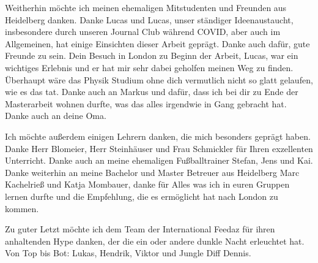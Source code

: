 Weitherhin möchte ich meinen ehemaligen Mitstudenten und Freunden aus Heidelberg danken. Danke Lucas und Lucas, unser ständiger Ideenaustaucht, insbesondere durch unseren Journal Club während COVID, aber auch im Allgemeinen, hat einige Einsichten dieser Arbeit geprägt. Danke auch dafür, gute Freunde zu sein. Dein Besuch in London zu Beginn der Arbeit, Lucas, war ein wichtiges Erlebnis und er hat mir sehr dabei geholfen meinen Weg zu finden. Überhaupt wäre das Physik Studium ohne dich vermutlich nicht so glatt gelaufen, wie es das tat. Danke auch an Markus und dafür, dass ich bei dir zu Ende der Masterarbeit wohnen durfte, was das alles irgendwie in Gang gebracht hat. Danke auch an deine Oma.

Ich möchte außerdem einigen Lehrern danken, die mich besonders geprägt haben. Danke Herr Blomeier, Herr Steinhäuser  und Frau Schmickler für Ihren exzellenten Unterricht. Danke auch an meine ehemaligen Fußballtrainer Stefan, Jens und Kai. Danke weiterhin an meine Bachelor und Master Betreuer aus Heidelberg Marc Kachelrieß und Katja Mombauer, danke für Alles was ich in euren Gruppen lernen durfte und die Empfehlung, die es ermöglicht hat nach London zu kommen.

Zu guter Letzt möchte ich dem Team der International Feedaz für ihren anhaltenden Hype danken, der die ein oder andere dunkle Nacht erleuchtet hat. Von Top bis Bot: Lukas, Hendrik, Viktor und Jungle Diff Dennis.

